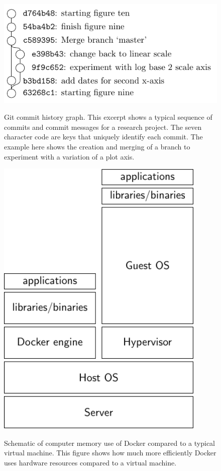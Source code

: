 \documentclass[american,man]{apa6}
\begin{document}
\newpage

\begin{figure}[h!]
  \caption{Git commit history graph. This excerpt shows a typical sequence of commits and commit messages for a research project. The seven character code are keys that uniquely identify each commit. The example here shows the creation and merging of a branch to experiment with a variation of a plot axis.}
  \centering
\includegraphics[width=\textwidth]{../figures/figure_git_graph.pdf}
\label{fig:git}
\end{figure}

\newpage

\begin{figure}[h!]
  \caption{Schematic of computer memory use of Docker compared to a typical virtual machine. This figure shows how much more efficiently Docker uses hardware resources compared to a virtual machine. }
  \centering
\includegraphics[width=10cm]{../figures/figure_virtual_environments.pdf}
\label{fig:docker}
\end{figure}
\end{document}
